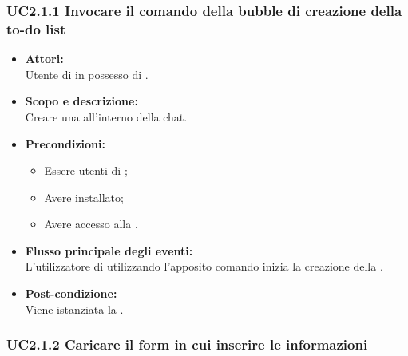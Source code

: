 \subsubsection{UC2.1.1 Invocare il comando della bubble di creazione della to-do list} \label{UC2.1.1}

\begin{itemize}
	\item \textbf{Attori:}
	\\Utente di  in possesso di \ProjectName{}.
	\item \textbf{Scopo e descrizione:} 
	\\Creare una  all'interno della chat.
	\item \textbf{Precondizioni:}
	\begin{itemize}
		\item Essere utenti di ;
		\item Avere \ProjectName{} installato;
		\item Avere accesso alla  .
	\end{itemize}
	\item \textbf{Flusso principale degli eventi:}
	\\L'utilizzatore di \ProjectName{} utilizzando l'apposito comando inizia la creazione della  .
	\item \textbf{Post-condizione:}
	\\Viene istanziata la .
\end{itemize}

\subsubsection{UC2.1.2 Caricare il form in cui inserire le informazioni} \label{UC2.1.2}

